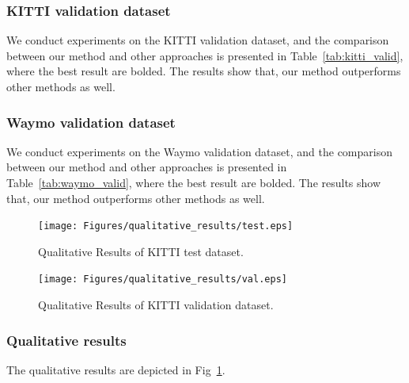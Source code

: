 \documentclass[journal]{IEEEtran}
\begin{document}
	\subsubsection{KITTI validation dataset} 
	We conduct experiments on the KITTI validation dataset, and the comparison between our method and other approaches is presented in Table~\ref{tab:kitti_valid}, where the best result are bolded. The results show that, our method outperforms other methods as well.
	
	\subsubsection{Waymo validation dataset} 
	We conduct experiments on the Waymo validation dataset, and the comparison between our method and other approaches is presented in Table~\ref{tab:waymo_valid}, where the best result are bolded. The results show that, our method outperforms other methods as well.
	\begin{figure}[!t]
	\centering
	\texttt{[image: Figures/qualitative\_results/test.eps]}
	\caption{Qualitative Results of KITTI test dataset.}
	\label{fig:qualitative result kitti test}
\end{figure}
	\begin{figure}[!t]
	\centering
	\texttt{[image: Figures/qualitative\_results/val.eps]}
	\caption{Qualitative Results of KITTI validation dataset.}
	\label{fig:qualitative result kitti valid}
\end{figure}
	\subsubsection{Qualitative results}
	The qualitative results are depicted in Fig~\ref{fig:qualitative result kitti test}.
	
\end{document}
